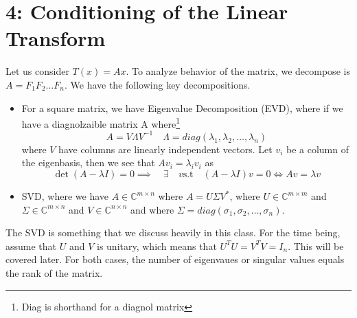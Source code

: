 \documentclass[11pt]{article}
\theoremstyle{definition}
\newcommand{\C}{\mathbb{C}}
\newcommand{\st}{\text{s.t}}
\begin{document}
\section{4: Conditioning of the Linear Transform}
Let us consider $T(x) = Ax$. To analyze behavior of the matrix, we decompose is $A = F_1 F_2 \dots F_n$. We have the following key decompositions. 
\begin{itemize}
  \item For a square matrix, we have Eigenvalue Decomposition (EVD), where if we have a diagnolzaible matrix A where\footnote{Diag is shorthand for a diagnol matrix} \[
  A = V \Lambda V^{-1} \quad \Lambda = diag(\lambda_1, \lambda_2, \dots, \lambda_n)
  \]
  where $V$ have columns are linearly independent vectors. Let $v_i$ be a column of the eigenbasis, then we see that $Av_i = \lambda_i v_i$ as 
  \[
  \det(A - \lambda I) = 0 \implies \quad \exists \quad v \st \quad (A - \lambda I)v = 0 \iff Av = \lambda v
  \]
  \item SVD, where we have $A \in \C^{m \times n}$ where $A = U \Sigma V^*$, where $U \in \C^{m \times m}$ and $\Sigma \in \C^{m \times n}$ and $V \in \C^{n \times n}$ and where $\Sigma = diag(\sigma_1, \sigma_2, \dots, \sigma_n)$. 
\end{itemize}
The SVD is something that we discuss heavily in this class. For the time being, assume that $U$ and $V$ is unitary, which means that $U^T U = V^T V = I_n$. This will be covered later. For both cases, the number of eigenvaues or singular values equals the rank of the matrix. 
\end{document}
